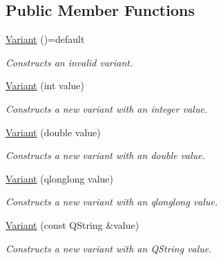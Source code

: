 \subsection*{Public Member Functions}
\begin{DoxyCompactItemize}
\item 
\mbox{\label{class_variant_a594b84b7c7a7e997aac3354bbdaa2d97}} 
\mbox{\hyperlink{class_variant_a594b84b7c7a7e997aac3354bbdaa2d97}{Variant}} ()=default
\begin{DoxyCompactList}\small\item\em Constructs an invalid variant. \end{DoxyCompactList}\item 
\mbox{\label{class_variant_a4bca2cf3c097e4fa9aea5c87c947e9a0}} 
\mbox{\hyperlink{class_variant_a4bca2cf3c097e4fa9aea5c87c947e9a0}{Variant}} (int value)
\begin{DoxyCompactList}\small\item\em Constructs a new variant with an integer value. \end{DoxyCompactList}\item 
\mbox{\label{class_variant_a7e7d9a46e166e059ce75b76b92b11457}} 
\mbox{\hyperlink{class_variant_a7e7d9a46e166e059ce75b76b92b11457}{Variant}} (double value)
\begin{DoxyCompactList}\small\item\em Constructs a new variant with an double value. \end{DoxyCompactList}\item 
\mbox{\label{class_variant_a6f86cea152e761f48700e41f210fe251}} 
\mbox{\hyperlink{class_variant_a6f86cea152e761f48700e41f210fe251}{Variant}} (qlonglong value)
\begin{DoxyCompactList}\small\item\em Constructs a new variant with an qlonglong value. \end{DoxyCompactList}\item 
\mbox{\label{class_variant_a2a2d8b7cc035142a795f86d481adde0c}} 
\mbox{\hyperlink{class_variant_a2a2d8b7cc035142a795f86d481adde0c}{Variant}} (const Q\+String \&value)
\begin{DoxyCompactList}\small\item\em Constructs a new variant with an Q\+String value. \end{DoxyCompactList}\end{DoxyCompactItemize}


